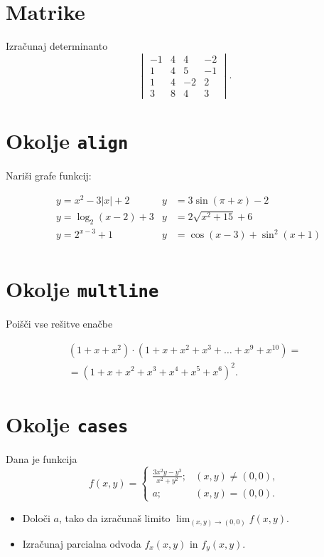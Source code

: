 \documentclass[a4paper,12pt]{article}
\begin{document}
\section*{Matrike}
Izračunaj determinanto
\[\begin{vmatrix}
    -1 & 4 & 4 & -2 \\
    1 & 4 & 5 & -1 \\
    1 & 4 & -2 & 2 \\
    3 & 8 & 4 & 3
\end{vmatrix}.\]

\section*{Okolje \texttt{align}}
Nariši grafe funkcij:

\begin{align*}
   & y = x^2 - 3|x| + 2   & y &= 3 \sin(\pi+x) - 2 \\
   & y = \log_2(x-2) + 3  & y &= 2 \sqrt{x^2+15} + 6 \\
   & y = 2^{x-3} + 1      & y &= \cos(x-3) + \sin^2(x+1) \\
\end{align*}


\section*{Okolje \texttt{multline}}
Poišči vse rešitve enačbe

\begin{multline*}
   (1+x+x^2) \cdot (1+x+x^2+x^3+\ldots+x^9+x^{10}) =\\
   =(1+x+x^2+x^3+x^4+x^5+x^6)^2.
\end{multline*}


\section*{Okolje \texttt{cases}}
Dana je funkcija
\[
f(x,y)=
\begin{cases}
   \frac{3x^2y-y^3}{x^2+y^2}; & (x,y)\ne(0,0), \\
   a; & (x,y)=(0,0).
\end{cases}
\]
\begin{itemize}
\item Določi \(a\), tako da izračunaš limito \( \lim_{(x,y)\to(0,0)} f(x,y) \).
\item Izračunaj parcialna odvoda \(f_x(x,y)\) in \(f_y(x,y)\).
\end{itemize}
\end{document}
